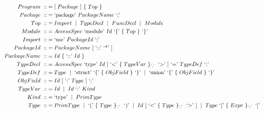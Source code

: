 \documentclass[letterpaper]{article}
\newcommand{\nonterminal}[1]{#1\ }
\newcommand{\terminal}[1]{\text{`#1'}\ }
\newcommand{\gramOption}[1]{[\ #1]\ }
\newcommand*{\gramRepeat}[2][]{\{\ #2\}_{#1}\ }
\newcommand{\gramOr}{\mid\ }
\begin{document}
\begin{align*}
%  
  \nonterminal{Program} ::&=
    \gramOption{\nonterminal{Package}} \gramRepeat{\nonterminal{Top}} \\
%
  \nonterminal{Package} ::&=
    \terminal{package} \nonterminal{PackageName} \terminal{;} \\
%
  \nonterminal{Top} ::&= \nonterminal{Import}
    \gramOr \nonterminal{TypeDecl}
    \gramOr \nonterminal{FuncDecl}
    \gramOr \nonterminal{Module} \\
%
  \nonterminal{Module} ::&=
    \nonterminal{AccessSpec} \terminal{module} \nonterminal {Id}
      \terminal{\{} \gramRepeat{\nonterminal{Top}} \terminal{\}} \\
%
  \nonterminal{Import} ::&=
    \terminal{use} \nonterminal{PackageId} \terminal{;} \\
%
  \nonterminal{PackageId} ::&=
    \nonterminal{PackageName} \gramOption{\terminal{::} \terminal{*}} \\
%
  \nonterminal{PackageName} ::&=
    \nonterminal{Id} \gramRepeat{\terminal{::} \nonterminal{Id}} \\
%
  \nonterminal{TypeDecl} ::&=
    \nonterminal{AccessSpec} \terminal{type} \nonterminal{Id}
      \gramOption{\terminal{\textless}
        \gramRepeat[\terminal{,}]{\nonterminal{TypeVar}} \terminal{\textgreater}}
      \terminal{=} \nonterminal{TypeDef} \terminal{;} \\
%
  \nonterminal{TypeDef} ::&= \nonterminal{Type}
    \gramOr \terminal{struct}
      \terminal{\{} \gramRepeat{\nonterminal{ObjField}} \terminal{\}}
    \gramOr \terminal{union}
      \terminal{\{} \gramRepeat{\nonterminal{ObjField}} \terminal{\}} \\
%
  \nonterminal{ObjField} ::&=
    \nonterminal{Id} \gramOption{\terminal{:} \nonterminal{Type}} \terminal{;} \\
%
  \nonterminal{TypeVar} ::&= \nonterminal{Id}
    \gramOr \nonterminal{Id} \terminal{:} \nonterminal{Kind} \\
%
  \nonterminal{Kind} ::&= \terminal{type} \gramOr \nonterminal{PrimType} \\
%
  \nonterminal{Type} ::&= \nonterminal{PrimType}
    \gramOr \terminal{(} \gramRepeat[\terminal{,}]{\nonterminal{Type}} \terminal{)}
    \gramOr \nonterminal{Id}
      \gramOption{\terminal{\textless}
        \gramRepeat[\terminal{,}]{\nonterminal{Type}} \terminal{\textgreater}}
    \gramOr \nonterminal{Type}
      \terminal{[} \gramRepeat[\terminal{,}]{\nonterminal{Expr}} \terminal{]} \\

\end{align*}
\end{document}
